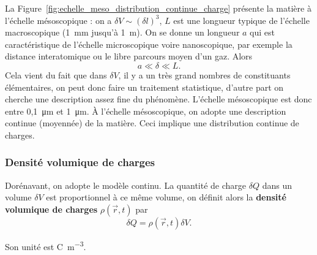             La Figure~\ref{fig:echelle_meso_distribution_continue_charge} présente la matière à l'échelle mésoscopique : on a $\delta V\sim(\delta l)^{3}$, $L$ est une longueur typique de l'échelle macroscopique (1~\si{\milli\metre} jusqu'à 1~\si{\metre}). On se donne un longueur $a$ qui est caractéristique de l'échelle microscopique voire nanoscopique, par exemple la distance interatomique ou le libre parcours moyen d'un gaz. Alors
            \begin{equation}
                \boxed{
                    a\ll \delta \ll L.
                }
            \end{equation}
            Cela vient du fait que dans $\delta V$, il y a un très grand nombres de constituants élémentaires, on peut donc faire un traitement statistique, d'autre part on cherche une description assez fine du phénomène. L'échelle mésoscopique est donc entre 0,1~\si{\micro\metre} et 1~\si{\micro\metre}. 
            À l'échelle mésoscopique, on adopte une description continue (moyennée) de la matière. Ceci implique une distribution continue de charges.

        \subsubsection{Densité volumique de charges}

            Dorénavant, on adopte le modèle continu. La quantité de charge $\delta Q$ dans un volume $\delta V$ est proportionnel à ce même volume, on définit alors la \textbf{densité volumique de charges} $\rho(\vec{r},t)$ par 
            \begin{equation}
                \boxed{
                    \delta Q=\rho(\vec{r},t)\delta V.
                }
            \end{equation}

            Son unité est \si{\coulomb\per\metre\cubed}.


